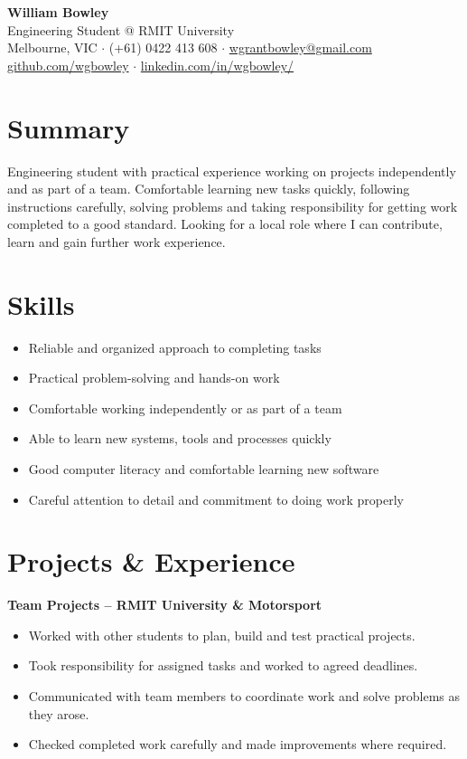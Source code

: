 \documentclass[11pt,a4paper]{article}
\begin{document}
\begin{center}
{\LARGE \textbf{William Bowley}} \\[4pt]
{\large Engineering Student @ RMIT University} \\[2pt]
Melbourne, VIC \quad $\cdot$ \quad (+61) 0422 413 608 \quad $\cdot$ \quad \href{mailto:wgrantbowley@gmail.com}{wgrantbowley@gmail.com} \\[2pt]
\href{https://github.com/wgbowley}{github.com/wgbowley} \quad $\cdot$ \quad
\href{https://linkedin.com/in/wgbowley}{linkedin.com/in/wgbowley/}
\end{center}

\section*{Summary}
\noindent Engineering student with practical experience working on projects 
independently and as part of a team. Comfortable learning new tasks quickly,
following instructions carefully, solving problems and taking responsibility 
for getting work completed to a good standard. Looking for a local role where 
I can contribute, learn and gain further work experience.

\section*{Skills}
\begin{itemize}[leftmargin=*, noitemsep, topsep=0pt]
\item Reliable and organized approach to completing tasks
\item Practical problem-solving and hands-on work
\item Comfortable working independently or as part of a team
\item Able to learn new systems, tools and processes quickly
\item Good computer literacy and comfortable learning new software
\item Careful attention to detail and commitment to doing work properly
\end{itemize}

\section*{Projects \& Experience}

\noindent\textbf{Team Projects -- RMIT University \& Motorsport}
\begin{itemize}[leftmargin=*, noitemsep, topsep=2pt]
\item Worked with other students to plan, build and test practical projects.
\item Took responsibility for assigned tasks and worked to agreed deadlines.
\item Communicated with team members to coordinate work and solve problems as they arose.
\item Checked completed work carefully and made improvements where required.
\end{itemize}
\end{document}
